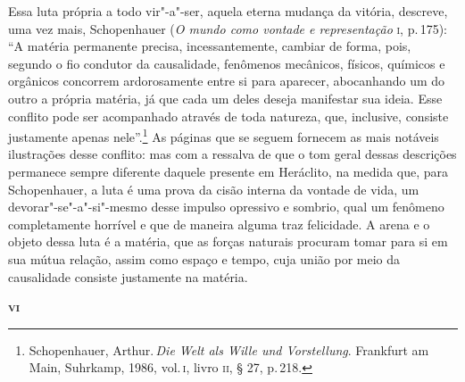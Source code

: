 Essa luta própria a todo vir"-a"-ser, aquela eterna mudança da vitória,
descreve, uma vez mais, Schopenhauer (\textit{O mundo como vontade e
representação} \textsc{i}, p.\,175): ``A matéria permanente precisa,
incessantemente, cambiar de forma, pois, segundo o fio condutor da
causalidade, fenômenos mecânicos, físicos, químicos e orgânicos concorrem
ardorosamente entre si para aparecer, abocanhando um do outro a própria
matéria, já que cada um deles deseja manifestar sua ideia. Esse conflito pode
ser acompanhado através de toda natureza, que, inclusive, consiste justamente
apenas nele''.\footnote{Schopenhauer, Arthur.\,\textit{Die Welt als Wille und
Vorstellung}. Frankfurt am Main, Suhrkamp, 1986, vol.\,\textsc{i}, livro \textsc{ii}, 
§ 27, p.\,218.} As páginas que se seguem fornecem as mais notáveis ilustrações 
desse conflito: mas com a ressalva de que o tom geral dessas descrições permanece 
sempre diferente daquele presente em Heráclito, na medida que, para Schopenhauer, 
a luta é uma prova da cisão interna da vontade de vida, um devorar"-se"-a"-si"-mesmo 
desse impulso opressivo e sombrio, qual um fenômeno completamente horrível e que de maneira
alguma traz felicidade. A arena e o objeto dessa luta é a matéria, que as forças naturais 
procuram tomar para si em sua mútua relação, assim como espaço e tempo, cuja união por 
meio da causalidade consiste justamente na matéria. 

\bigskip
\textsc{\textbf{vi}}
\bigskip

